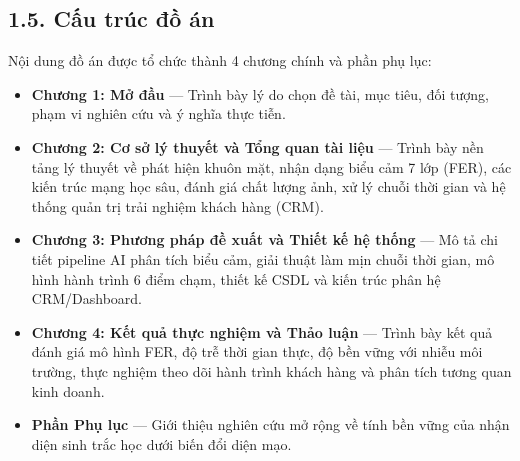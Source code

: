 \subsection*{1.5. Cấu trúc đồ án}

Nội dung đồ án được tổ chức thành 4 chương chính và phần phụ lục:
\begin{itemize}
    \item \textbf{Chương 1: Mở đầu} — Trình bày lý do chọn đề tài, mục tiêu, đối tượng, phạm vi nghiên cứu và ý nghĩa thực tiễn.
    \item \textbf{Chương 2: Cơ sở lý thuyết và Tổng quan tài liệu} — Trình bày nền tảng lý thuyết về phát hiện khuôn mặt, nhận dạng biểu cảm 7 lớp (FER), các kiến trúc mạng học sâu, đánh giá chất lượng ảnh, xử lý chuỗi thời gian và hệ thống quản trị trải nghiệm khách hàng (CRM).
    \item \textbf{Chương 3: Phương pháp đề xuất và Thiết kế hệ thống} — Mô tả chi tiết pipeline AI phân tích biểu cảm, giải thuật làm mịn chuỗi thời gian, mô hình hành trình 6 điểm chạm, thiết kế CSDL và kiến trúc phân hệ CRM/Dashboard.
    \item \textbf{Chương 4: Kết quả thực nghiệm và Thảo luận} — Trình bày kết quả đánh giá mô hình FER, độ trễ thời gian thực, độ bền vững với nhiễu môi trường, thực nghiệm theo dõi hành trình khách hàng và phân tích tương quan kinh doanh.
    \item \textbf{Phần Phụ lục} — Giới thiệu nghiên cứu mở rộng về tính bền vững của nhận diện sinh trắc học dưới biến đổi diện mạo.
\end{itemize}

\newpage
